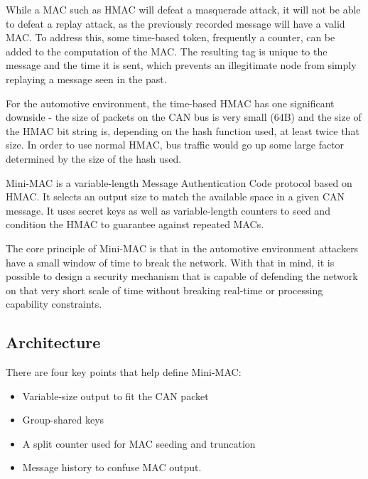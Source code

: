 While a MAC such as HMAC will defeat a masquerade attack, it will not be able to defeat a replay attack, as the previously recorded message will have a valid MAC. To address this, some time-based token, frequently a counter, can be added to the computation of the MAC. The resulting tag is unique to the message and the time it is sent, which prevents an illegitimate node from simply replaying a message seen in the past.

For the automotive environment, the time-based HMAC has one significant downside - the size of packets on the CAN bus is very small (64B) and the size of the HMAC bit string is, depending on the hash function used, at least twice that size. In order to use normal HMAC, bus traffic would go up some large factor determined by the size of the hash used. 

Mini-MAC is a variable-length Message Authentication Code protocol based on HMAC. It selects an output size to match the available space in a given CAN message. It uses secret keys as well as variable-length counters to seed and condition the HMAC to guarantee against repeated MACs.

The core principle of Mini-MAC is that in the automotive environment attackers have a small window of time to break the network. With that in mind, it is possible to design a security mechanism that is capable of defending the network on that very short scale of time without breaking real-time or processing capability constraints.

\subsection{Architecture}


There are four key points that help define Mini-MAC:
\begin{itemize}
\item Variable-size output to fit the CAN packet
\item Group-shared keys
\item A split counter used for MAC seeding and truncation
\item Message history to confuse MAC output.
\end{itemize}

